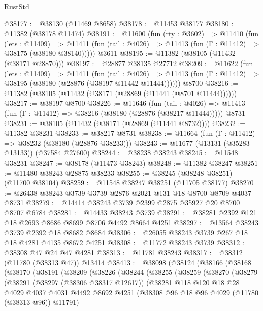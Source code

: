 \begin{lexlean}{RustStd}
\begin{coremodule}
@38177 := @38130 (@11469 @8658)
@38178 := @11453 @38177
@38180 := @11382 (@38178 @11474)
@38191 := @11600
    (fun (rty : @3602) =>
    @11410
      (fun (lets : @11409) =>
      @11411 (fun (tail : @4026) => @11413 (fun (Γ : @11412) => @38175 (@38180 @38140)))))
    @3611
@38195 := @11382 (@38105 (@11432 (@38171 @28870)))
@38197 := @28877 @38135 @27712
@38209 := @11622
    (fun (lets : @11409) =>
    @11411
      (fun (tail : @4026) =>
      @11413 (fun (Γ : @11412) => @38195 (@38180 (@28876 (@38197 @11442 @11444))))))
    @8700
@38216 := @11382 (@38105 (@11432 (@38171 (@28869 (@11441 (@8701 @11444))))))
@38217 := @38197 @8700
@38226 := @11646
    (fun (tail : @4026) => @11413 (fun (Γ : @11412) => @38216 (@38180 (@28876 (@38217 @11444)))))
    @8731
@38231 := @38105 (@11432 (@38171 (@28869 (@11441 @8732))))
@38232 := @11382 @38231
@38233 := @38217 @8731
@38238 := @11664 (fun (Γ : @11412) => @38232 (@38180 (@28876 @38233)))
@38243 := @11677 (@13131 (@35283 @13133)) (@37584 @27600)
@38244 := @38238 @38243
@38245 := @11548 @38231
@38247 := @38178 (@11473 @38243)
@38248 := @11382 @38247
@38251 := @11480 @38243 @28875 @38233
@38255 := @38245 (@38248 @38251) (@11700 @38104)
@38259 := @11548 @38247 @38251 (@11705 @38177)
@38270 := @26438 @38243 @3739 @3739 @2876 @2021 @131 @18 @8700 @8709 @4037 @8731
@38279 := @14414 @38243 @3739 @2399 @2875 @35927 @20 @8700 @8707 @6784
@38281 := @14433 @38243 @3739
@38291 := @38281 @2392 @121 @18 @2693 @8686 @8699 @8706 @4492 @8664 @4251
@38297 := @13564 @38243 @3739 @2392 @18 @8682 @8684
@38306 := @26055 @38243 @3739 @267 @18 @18 @4281 @4135 @8672 @4251
@38308 := @11772 @38243 @3739
@38312 := @38308 @47 @24 @47 @4281
@38313 := @11781 @38243
@38317 := @38312 (@11780 (@38313 @47)) @13414
@38413 := @38098
    (@38124
      (@38166
        (@38168
          (@38170
            (@38191
              (@38209
                (@38226
                  (@38244
                    (@38255
                      (@38259
                        (@38270
                          (@38279
                            (@38291
                              (@38297 (@38306 @38317 @12617))
                              (@38281
                                @118
                                @120
                                @18
                                @28
                                @4029
                                @4037
                                @4031
                                @4492
                                @8692
                                @4251
                                (@38308 @96 @18 @96 @4029 (@11780 (@38313 @96)) @11791)

\end{coremodule}
\end{lexlean}
